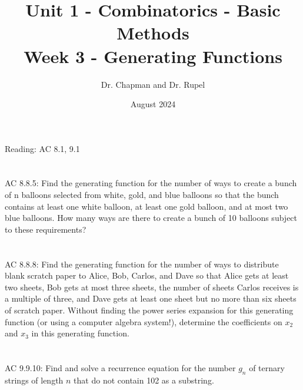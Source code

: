 \documentclass{article}
\title{Unit 1 - Combinatorics - Basic Methods\\ Week 3 - Generating Functions}
\author{Dr. Chapman and Dr. Rupel}
\date{August 2024}
\begin{document}
\maketitle
Reading: AC 8.1, 9.1
\section{}
AC 8.8.5:
Find the generating function for the number of ways to create a bunch of n balloons selected from white,
gold, and blue balloons so that the bunch contains at least one white balloon, at least one gold balloon,
and at most two blue balloons. How many ways are there to create a bunch of 10 balloons subject to these
requirements?
\section{}
AC 8.8.8:
Find the generating function for the number of ways to distribute blank scratch paper to Alice, Bob, Carlos,
and Dave so that Alice gets at least two sheets, Bob gets at most three sheets, the number of sheets Carlos
receives is a multiple of three, and Dave gets at least one sheet but no more than six sheets of scratch
paper. Without finding the power series expansion for this generating function (or using a computer algebra
system!), determine the coefficients on $x_2$ and $x_3$ in this generating function.
\section{}
AC 9.9.10:
Find and solve a recurrence equation for the number $g_n$ of ternary strings of length $n$ that do not contain
102 as a substring.
\end{document}
